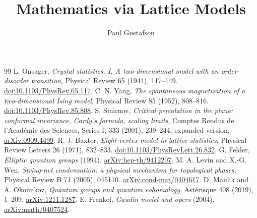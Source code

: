 \documentclass[11pt]{article}
\title{Mathematics via Lattice Models}
\author{Paul Gustafson}
\date{}
\theoremstyle{definition}
\begin{document}
\maketitle
\begingroup
\small
\setlength{\parskip}{0pt}
\makeatletter
\renewcommand*\l@part[2]{%
  \addpenalty\@secpenalty
  \addvspace{1.25em plus 1pt}%
  {\large\bfseries\parindent\z@\rightskip\@pnumwidth
   \parfillskip-\@pnumwidth
   \leavevmode #1\nobreak\hfil\nobreak
   \hb@xt@\@pnumwidth{\hss #2}\par}%
  \nobreak}
\renewcommand*\l@section{\@dottedtocline{1}{1.5em}{2.6em}}
\makeatother
\tableofcontents
\endgroup
\clearpage















\begin{thebibliography}{99}
L. Onsager, \emph{Crystal statistics. I. A two-dimensional model
with an order-disorder transition}, Physical Review 65 (1944),
117--149. \href{https://doi.org/10.1103/PhysRev.65.117}{doi:10.1103/PhysRev.65.117}.
C. N. Yang, \emph{The spontaneous magnetization of a two-dimensional
Ising model}, Physical Review 85 (1952), 808--816.
\href{https://doi.org/10.1103/PhysRev.85.808}{doi:10.1103/PhysRev.85.808}.
S. Smirnov, \emph{Critical percolation in the plane:
conformal invariance, Cardy's formula, scaling limits},
Comptes Rendus de l'Acad\'emie des Sciences, Series I,
333 (2001), 239--244; expanded version,
\href{https://arxiv.org/abs/0909.4499}{arXiv:0909.4499}.
R. J. Baxter, \emph{Eight-vertex model in lattice statistics},
Physical Review Letters 26 (1971), 832--833.
\href{https://doi.org/10.1103/PhysRevLett.26.832}{doi:10.1103/PhysRevLett.26.832}.
G. Felder, \emph{Elliptic quantum groups} (1994),
\href{https://arxiv.org/abs/hep-th/9412207}{arXiv:hep-th/9412207}.
M. A. Levin and X.-G. Wen, \emph{String-net condensation:
a physical mechanism for topological phases}, Physical Review B
71 (2005), 045110.
\href{https://arxiv.org/abs/cond-mat/0404617}{arXiv:cond-mat/0404617}.
D. Maulik and A. Okounkov, \emph{Quantum groups and quantum
cohomology}, Ast\'erisque 408 (2019), 1--209.
\href{https://arxiv.org/abs/1211.1287}{arXiv:1211.1287}.
E. Frenkel, \emph{Gaudin model and opers} (2004),
\href{https://arxiv.org/abs/math/0407524}{arXiv:math/0407524}.
\end{thebibliography}
\end{document}
